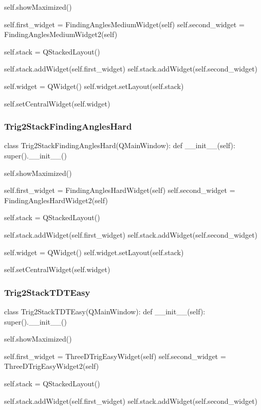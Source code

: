 \begin{landscape}
\begin{python}
        self.showMaximized()

        self.first_widget = FindingAnglesMediumWidget(self)
        self.second_widget = FindingAnglesMediumWidget2(self)

        self.stack = QStackedLayout()

        self.stack.addWidget(self.first_widget)
        self.stack.addWidget(self.second_widget)

        self.widget = QWidget()
        self.widget.setLayout(self.stack)

        self.setCentralWidget(self.widget)
\end{python}

\subsubsection{Trig2StackFindingAnglesHard}

\begin{python}
class Trig2StackFindingAnglesHard(QMainWindow):
    def __init__(self):
        super().__init__()

        self.showMaximized()

        self.first_widget = FindingAnglesHardWidget(self)
        self.second_widget = FindingAnglesHardWidget2(self)

        self.stack = QStackedLayout()

        self.stack.addWidget(self.first_widget)
        self.stack.addWidget(self.second_widget)

        self.widget = QWidget()
        self.widget.setLayout(self.stack)

        self.setCentralWidget(self.widget)
\end{python}

\subsubsection{Trig2StackTDTEasy}

\begin{python}
class Trig2StackTDTEasy(QMainWindow):
    def __init__(self):
        super().__init__()

        self.showMaximized()

        self.first_widget = ThreeDTrigEasyWidget(self)
        self.second_widget = ThreeDTrigEasyWidget2(self)

        self.stack = QStackedLayout()

        self.stack.addWidget(self.first_widget)
        self.stack.addWidget(self.second_widget)


\end{python}
\end{landscape}
